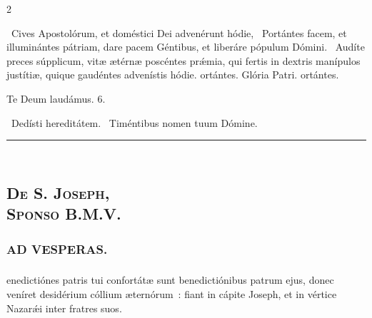\documentclass[9pt,twoside]{extarticle}
\begin{document}
\begin{multicols}{2}
{\begin{tightlist}{}
\item {}~Cives Apostolórum, et doméstici Dei advenérunt hódie, \textred{*}~Portántes facem, et illuminántes pátriam, dare pacem Géntibus, et liberáre pópulum Dómini. ~Audíte preces súpplicum, vitæ ætérnæ poscéntes prǽmia, qui fertis in dextris manípulos justítiæ, quique gaudéntes advenístis hódie. ortántes. Glória Patri. ortántes.
\item Te Deum laudámus. 6.
\item {}~Dedísti hereditátem. ~Timéntibus nomen tuum Dómine.
\end{tightlist}

\begin{center}\textcolor{red}{\rule{\linewidth}{0.5pt}} \end{center}

\subsection*{\center {}}
\subsection*{\center \textsc{\\ De S. Joseph,\\ Sponso B.M.V.}}
\subsubsection*{\center {}}

\subsubsection*{\center \textsc{AD VESPERAS.}}
\subsubsection*{}
enedictiónes patris tui confortátæ sunt benedictiónibus patrum ejus, donec veníret desidérium cóllium æternórum~: fiant in cápite Joseph, et in vértice Nazarǽi inter fratres suos.

}
\end{multicols}
\end{document}

